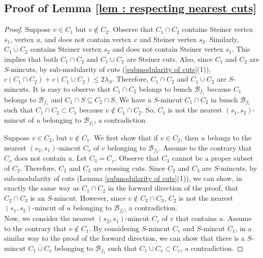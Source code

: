 \documentclass[letterpaper,11pt]{article}
\begin{document}
\subsection{Proof of Lemma \ref{lem : respecting nearest cuts}} \label{app : respecting nearest cuts}
\begin{proof}
    Suppose $v\in C_1$ but $v\notin C_2$. Observe that $C_1\cap C_2$ contains Steiner vertex $s_1$, vertex $u$, and does not contain vertex $v$ and Steiner vertex $s_2$. Similarly, $\overline{C_1\cup C_2}$ contains Steiner vertex $s_2$ and does not contain Steiner vertex $s_1$. This implies that both $C_1\cap C_2$ and $C_1\cup C_2$ are Steiner cuts. Also, since $C_1$ and $C_2$ are $S$-mincuts, by sub-modularity of cuts (\ref{submodularity of cuts}(1)), $c(C_1\cap C_2)+c(C_1\cup C_2)\le 2\lambda_S$. Therefore, $C_1\cap C_2$ and $C_1\cup C_2$ are $S$-mincuts. It is easy to observe that $C_1\cap C_2$ belongs to bunch ${\mathcal B}_{f_1}$ because $C_1$ belongs to ${\mathcal B}_{f_1}$ and $C_1\cap S\subseteq C_2\cap S$. We have a $S$-mincut $C_1\cap C_2$ in bunch ${\mathcal B}_{f_1}$ such that $C_1\cap C_2\subset C_1$ because $v\notin C_1\cap C_2$. So, $C_1$ is not the nearest $(s_1,s_2)$-mincut of $u$ belonging to ${\mathcal B}_{f_1}$, a contradiction. 

    Suppose $v\in C_2$, but $v\notin C_1$. We first show that if $v\in C_2$, then $u$ belongs to the nearest $(s_2,s_1)$-mincut $C_v$ of $v$ belonging to ${\mathcal B}_{f_2}$. Assume to the contrary that $C_v$ does not contain $u$. Let $C_3=\overline{C_v}$. Observe that $C_3$ cannot be a proper subset of $C_2$. Therefore, $C_2$ and $C_3$ are crossing cuts. Since $C_2$ and $C_3$ are $S$-mincuts, by sub-modularity of cuts (Lemma \ref{submodularity of cuts}(1)), we can show, in exactly the same way as $C_1\cap C_2$ in the forward direction of the proof, that $C_2\cap C_3$ is an $S$-mincut. However, since $v\notin C_2\cap C_3$, $C_2$ is not the nearest $(s_1,s_2)$-mincut of $u$ belonging to ${\mathcal B}_{f_2}$, a contradiction.\\
    Now, we consider the nearest $(s_2,s_1)$-mincut $C_v$ of $v$ that contains $u$. Assume to the contrary that $v\notin C_1$. By considering $S$-mincut $C_v$ and $S$-mincut $C_1$, in a similar way to the proof of the forward direction, we can show that there is a $S$-mincut $\overline{C_1\cup C_v}$ belonging to ${\mathcal B}_{f_2}$ such that $\overline{C_1\cup C_v}\subset C_v$, a contradiction.  
\end{proof}
\end{document}
